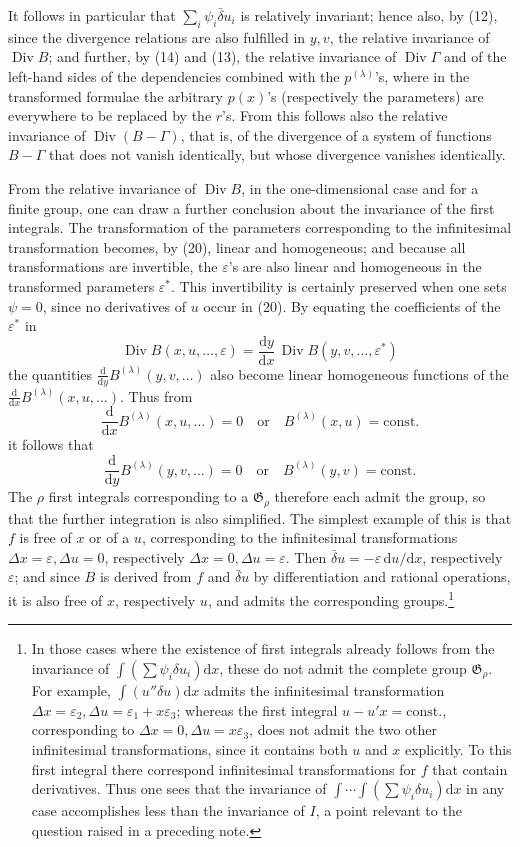 \documentclass[11pt]{article}
\newcommand{\D}{\Delta}
\providecommand{\eps}{\varepsilon}
\providecommand{\dd}{\mathrm d}
\providecommand{\Div}{\operatorname{Div}}
\providecommand{\G}{\mathfrak G}
\providecommand{\bd}{\bar{\delta}}
\begin{document}
It follows in particular that \(\sum_i\psi_i\bd u_i\) is relatively invariant; hence also, by (12), since the divergence relations are also fulfilled in \(y,v\), the relative invariance of \(\Div B\); and further, by (14) and (13), the relative invariance of \(\Div\Gamma\) and of the left-hand sides of the dependencies combined with the \(p^{(\lambda)}\)'s, where in the transformed formulae the arbitrary \(p(x)\)'s (respectively the parameters) are everywhere to be replaced by the \(r\)'s. From this follows also the relative invariance of \(\Div(B-\Gamma)\), that is, of the divergence of a system of functions \(B-\Gamma\) that does not vanish identically, but whose divergence vanishes identically.

From the relative invariance of \(\Div B\), in the one-dimensional case and for a finite group, one can draw a further conclusion about the invariance of the first integrals. The transformation of the parameters corresponding to the infinitesimal transformation becomes, by (20), linear and homogeneous; and because all transformations are invertible, the \(\eps\)'s are also linear and homogeneous in the transformed parameters \(\eps^*\). This invertibility is certainly preserved when one sets \(\psi=0\), since no derivatives of \(u\) occur in (20). By equating the coefficients of the \(\eps^*\) in
\[
\Div B(x,u,\ldots,\eps)=\frac{\dd y}{\dd x}\,\Div B(y,v,\ldots,\eps^*)
\]
the quantities \(\frac{\dd}{\dd y}B^{(\lambda)}(y,v,\ldots)\) also become linear homogeneous functions of the \(\frac{\dd}{\dd x}B^{(\lambda)}(x,u,\ldots)\). Thus from
\[
\frac{\dd}{\dd x}B^{(\lambda)}(x,u,\ldots)=0
\quad\text{or}\quad B^{(\lambda)}(x,u)=\mathrm{const.}
\]
it follows that
\[
\frac{\dd}{\dd y}B^{(\lambda)}(y,v,\ldots)=0
\quad\text{or}\quad B^{(\lambda)}(y,v)=\mathrm{const.}
\]
The \(\rho\) first integrals corresponding to a \(\G_\rho\) therefore each admit the group, so that the further integration is also simplified. The simplest example of this is that \(f\) is free of \(x\) or of a \(u\), corresponding to the infinitesimal transformations \(\D x=\eps,\D u=0\), respectively \(\D x=0,\D u=\eps\). Then \(\bd u=-\eps\,\dd u/\dd x\), respectively \(\eps\); and since \(B\) is derived from \(f\) and \(\bd u\) by differentiation and rational operations, it is also free of \(x\), respectively \(u\), and admits the corresponding groups.\footnote{In those cases where the existence of first integrals already follows from the invariance of \(\int(\sum\psi_i\delta u_i)\dd x\), these do not admit the complete group \(\G_\rho\). For example, \(\int(u''\delta u)\dd x\) admits the infinitesimal transformation \(\D x=\eps_2,\D u=\eps_1+x\eps_3\); whereas the first integral \(u-u'x=\mathrm{const.}\), corresponding to \(\D x=0,\D u=x\eps_3\), does not admit the two other infinitesimal transformations, since it contains both \(u\) and \(x\) explicitly. To this first integral there correspond infinitesimal transformations for \(f\) that contain derivatives. Thus one sees that the invariance of \(\int\!\cdots\!\int(\sum\psi_i\delta u_i)\dd x\) in any case accomplishes less than the invariance of \(I\), a point relevant to the question raised in a preceding note.}
\end{document}
